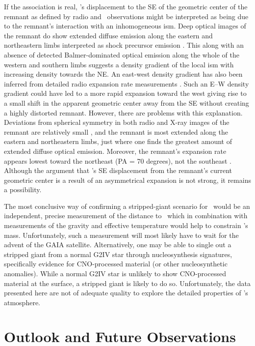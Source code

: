 If the association is real, \starg's displacement to the SE of the geometric
center of the remnant as defined by radio and \xray\ observations might
be interpreted as being due to the remnant's interaction with an
inhomogeneous \gls{ism}.  Deep optical images of the remnant do show
extended diffuse emission along the eastern and northeastern limbs
interpreted as shock precursor emission
\citep{2000ApJ...535..266G}. This along with an absence of detected
Balmer-dominated optical emission along the whole of the western and
southern limbs suggests a density gradient of the local \gls{ism} with increasing density towards the NE. An east-west density
gradient has also been inferred from detailed radio expansion rate
measurements \citep{1997ApJ...491..816R}.  Such an E--W density
gradient could have led to a more rapid expansion toward the west
giving rise to a small shift in the apparent geometric center away
from the SE without creating a highly distorted remnant.  However, there are problems with this explanation. Deviations from spherical symmetry in both radio and X-ray
images of the remnant are relatively small
\citep{1997ApJ...491..816R,2007ApJ...665..315C}, and the remnant is
most extended along the eastern and northeastern limbs, just where one
finds the greatest amount of extended diffuse optical
emission.
Moreover, the remnant's expansion rate appears lowest toward
the northeast (PA = 70 degrees), not the southeast \citep{1997ApJ...491..816R}. Although the
argument that \starg's SE displacement from the remnant's current
geometric center is a result of an asymmetrical expansion is not
strong, it remains a possibility.

The most conclusive way of confirming a stripped-giant scenario for
\starg\ would be an independent, precise measurement of the distance
to \starg\ which in combination with measurements of the gravity and
effective temperature would help to constrain \starg's
mass. Unfortunately, such a measurement will most likely have to wait
for the advent of the GAIA satellite.  Alternatively, one may be able
to single out a stripped giant from a normal G2IV star through
nucleosynthesis signatures, specifically evidence for CNO-processed
material (or other nucleosynthetic anomalies).  While a normal G2IV star is unlikely to show CNO-processed
material at the surface, a stripped giant is likely to do so. Unfortunately, the data presented here are not of adequate quality to explore the detailed properties of \starg's atmosphere.

\section{Outlook and Future Observations}

